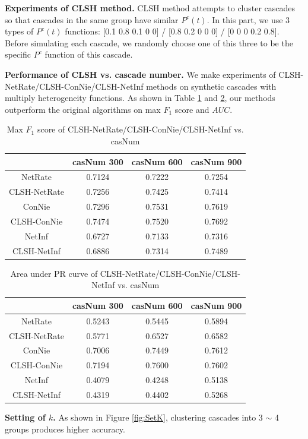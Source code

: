 \textbf{Experiments of CLSH method.}
CLSH method attempts to cluster cascades so that cascades in the same group have similar $P^c(t)$. In this part, we use 3 types of $P^c(t)$ functions: [0.1 0.8 0.1 0 0] / [0.8 0.2 0 0 0] / [0 0 0 0.2 0.8]. Before simulating each cascade, we randomly choose one of this three to be the specific $P^c$ function of this cascade.  

\textbf{Performance of CLSH vs. cascade number.} We make experiments of CLSH-NetRate/CLSH-ConNie/CLSH-NetInf methods on synthetic cascades with multiply heterogeneity functions. As shown in Table \ref{tab:synCLSHCASf1} and \ref{tab:synCLSHCASAUC}, our methods outperform the original algorithms on max $F_1$ score and $AUC$. 
\begin{table}[H]
\caption{Max $F_1$ score of CLSH-NetRate/CLSH-ConNie/CLSH-NetInf vs. casNum}
\begin{tabular}{c|c|c|c}
 & casNum 300 & casNum 600 & casNum 900 \\
\hline
NetRate & 0.7124 & 0.7222 & 0.7254\\
CLSH-NetRate & 0.7256 & 0.7425 & 0.7414\\
\hline
ConNie & 0.7296 & 0.7531 & 0.7619\\
CLSH-ConNie & 0.7474 & 0.7520 & 0.7692\\
\hline
NetInf & 0.6727 & 0.7133 & 0.7316\\
CLSH-NetInf & 0.6886 & 0.7314 & 0.7489
\end{tabular}\label{tab:synCLSHCASf1}
\end{table}
\begin{table}[H]
\caption{Area under PR curve of CLSH-NetRate/CLSH-ConNie/CLSH-NetInf vs. casNum}
\begin{tabular}{c|c|c|c}
 & casNum 300 & casNum 600 & casNum 900 \\
\hline
NetRate & 0.5243 & 0.5445 & 0.5894\\
CLSH-NetRate & 0.5771 & 0.6527 & 0.6582\\
\hline
ConNie & 0.7006 & 0.7449 & 0.7612\\
CLSH-ConNie & 0.7194 & 0.7600 & 0.7602\\
\hline
NetInf & 0.4079 & 0.4248 & 0.5138\\
CLSH-NetInf & 0.4319 & 0.4402 & 0.5268
\end{tabular}\label{tab:synCLSHCASAUC}
\end{table}
\textbf{Setting of $k$.} As shown in Figure \ref{fig:SetK}, clustering cascades into 3 $\sim$ 4 groups produces higher accuracy.

